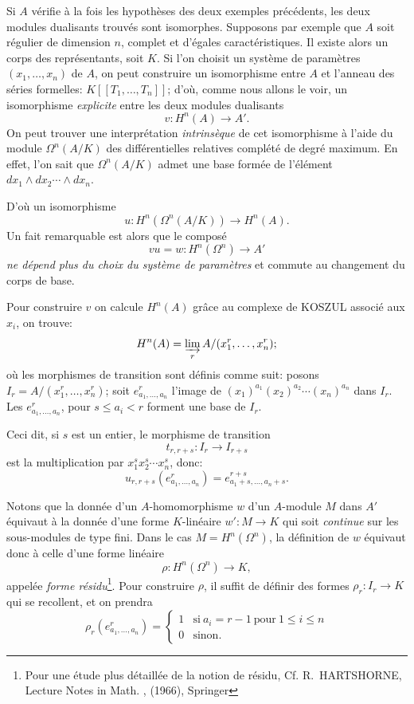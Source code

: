 \begin{remarque} \label{IV.5.5}
Si $A$ v\'erifie \`a la fois les hypoth\`eses des deux exemples pr\'ec\'edents, les deux modules dualisants trouv\'es sont isomorphes. Supposons par exemple que $A$ soit r\'egulier de dimension $n$, complet et d'\'egales caract\'eristiques. Il existe alors un corps des repr\'esentants, soit $K$. Si l'on choisit un syst\`eme de param\`etres $(x_{1}, \ldots, x_{n})$ de $A$, on peut construire un isomorphisme entre $A$ et l'anneau des s\'eries formelles: $K[[T_{1}, \ldots, T_{n}]]$; d'o\`u, comme nous allons le voir, un isomorphisme \emph{explicite} entre les deux modules dualisants
$$
v\colon H^{n}(A)\to A'.
$$
On peut trouver une interpr\'etation \emph{intrinsèque} de cet isomorphisme \`a l'aide du module $\Omega^{n}(A/K)$ des diff\'erentielles relatives compl\'et\'e de degr\'e maximum. En effet, l'on sait que $\Omega^{n}(A/K)$ admet une base form\'ee de l'\'el\'ement $dx_{1}\wedge dx_{2}\cdots \wedge dx_{n}$.

D'o\`u un isomorphisme
$$
u\colon H^{n}(\Omega^{n}(A/K))\to H^{n}(A).
$$
Un fait remarquable est alors que le compos\'e
$$
vu=w\colon H^{n}(\Omega^{n})\to A'
$$
\emph{ne dépend plus du choix du système de paramètres} et commute au changement du corps de base.

Pour construire $v$ on calcule $H^{n}(A)$ gr\^ace au complexe de KOSZUL associ\'e aux $x_{i}$, on trouve:
$$
H^{n}(A)=\varinjlim_{r}A/(x_{1}^{r}, \ldots, x_{n}^{r});
$$
o\`u les morphismes de transition sont d\'efinis comme suit: posons $I_{r}=A/(x_{1}^{r}, \ldots, x_{n}^{r})$; soit $e_{a_{1}, \ldots, a_{n}}^{r}$ l'image de $(x_{1})^{a_{1}}(x_{2})^{a_{2}}\cdots (x_{n})^{a_{n}}$ dans $I_{r}$. Les $e_{a_{1}, \ldots, a_{n}}^{r}$, pour $s\leq a_{i}<r$ forment une base de $I_{r}$.

Ceci dit, si $s$ est un entier, le morphisme de transition
$$
t_{r, r+s}\colon I_{r}\to I_{r+s}
$$
est la multiplication par $x_{1}^{s}x_{2}^{s}\cdots x_{n}^{s}$, donc:
$$
u_{r, r+s}(e_{a_{1}, \ldots, a_{n}}^{r})=e_{a_{1}+s, \ldots, a_{n}+s}^{r+s}.
$$

Notons que la donn\'ee d'un $A$-homomorphisme $w$ d'un $A$-module $M$ dans $A'$ \'equivaut \`a la donn\'ee d'une forme $K$-lin\'eaire $w':M\to K$ qui soit \emph{continue} sur les sous-modules de type fini. Dans le cas $M=H^{n}(\Omega^{n})$, la d\'efinition de $w$ \'equivaut donc \`a celle d'une forme lin\'eaire
$$
\rho \colon H^{n}(\Omega^{n})\to K,
$$
appel\'ee \emph{forme résidu}\label{pagecithar}\footnote{\label{cithar}Pour une \'etude plus d\'etaill\'ee de la notion de r\'esidu, Cf. R.~HARTSHORNE, Lecture Notes in Math. , (1966), Springer}. Pour construire $\rho$, il suffit de d\'efinir des formes $\rho_{r}:I_{r}\to K$ qui se recollent, et on prendra
$$
\rho_{r}(e_{a_{1}, \ldots, a_{n}}^{r})=
\begin{cases}
1&\text{si}\ a_{i}=r-1\ \text{pour}\ 1\leq i\leq n\\
0& \text{sinon.}
\end{cases}
$$
\end{remarque}



